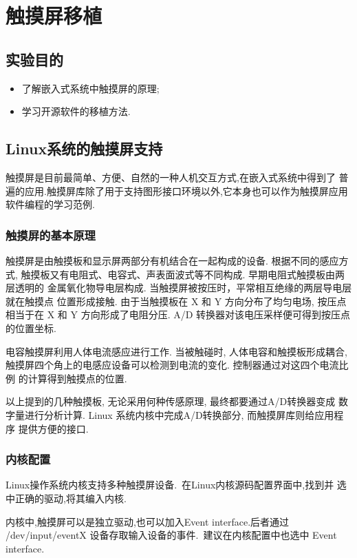 \chapter{触摸屏移植}\label{ch-ts}
\section{实验目的}
\begin{itemize}\itemsep=-3pt
  \item 了解嵌入式系统中触摸屏的原理;
  \item 学习开源软件的移植方法.
\end{itemize}

\section{Linux系统的触摸屏支持}
	触摸屏是目前最简单、方便、自然的一种人机交互方式,在嵌入式系统中得到了
普遍的应用.触摸屏库除了用于支持图形接口环境以外,它本身也可以作为触摸屏应用
软件编程的学习范例.

\subsection{触摸屏的基本原理}
    触摸屏是由触摸板和显示屏两部分有机结合在一起构成的设备. 根据不同的感应方式,
触摸板又有电阻式、电容式、声表面波式等不同构成. 早期电阻式触摸板由两层透明的
金属氧化物导电层构成. 当触摸屏被按压时，平常相互绝缘的两层导电层就在触摸点
位置形成接触. 由于当触摸板在 X 和 Y 方向分布了均匀电场, 按压点相当于在 X 和
Y 方向形成了电阻分压. A/D 转换器对该电压采样便可得到按压点的位置坐标.

    电容触摸屏利用人体电流感应进行工作. 当被触碰时, 人体电容和触摸板形成耦合,
触摸屏四个角上的电感应设备可以检测到电流的变化. 控制器通过对这四个电流比例
的计算得到触摸点的位置.

    以上提到的几种触摸板, 无论采用何种传感原理, 最终都要通过A/D转换器变成
数字量进行分析计算. Linux 系统内核中完成A/D转换部分, 而触摸屏库则给应用程序
提供方便的接口.

\subsection{内核配置}
	Linux操作系统内核支持多种触摸屏设备.~在Linux内核源码配置界面中,找到并
选中正确的驱动,将其编入内核.

	内核中,触摸屏可以是独立驱动,也可以加入Event interface.后者通过
 /dev/input/eventX 设备存取输入设备的事件.~建议在内核配置中也选中
 Event interface.

